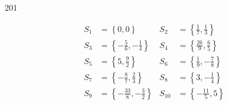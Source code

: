 


  \begin{corrige}{201}

\begin{align*}
S_{1}&=\left\{0,0\right\}&S_{2}&=\left\{\frac{1}{7},\frac{1}{3}\right\}\\
S_{3}&=\left\{-\frac{5}{6},-\frac{1}{4}\right\}&S_{4}&=\left\{\frac{26}{9},\frac{6}{5}\right\}\\
S_{5}&=\left\{5,\frac{9}{2}\right\}&S_{6}&=\left\{\frac{1}{9},-\frac{7}{8}\right\}\\
S_{7}&=\left\{-\frac{8}{7},\frac{2}{3}\right\}&S_{8}&=\left\{3,-\frac{1}{4}\right\}\\
S_{9}&=\left\{-\frac{33}{8},-\frac{3}{2}\right\}&S_{10}&=\left\{-\frac{11}{5},5\right\}
\end{align*}
 \end{corrige}